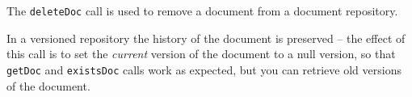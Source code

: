The \verb+deleteDoc+ call is used to remove a document from a document repository.

In a versioned repository the history of the document is preserved -- the effect of
this call is to set the \emph{current} version of the document to a null version, so
that \verb+getDoc+ and \verb+existsDoc+ calls work as expected, but you can retrieve
old versions of the document.
